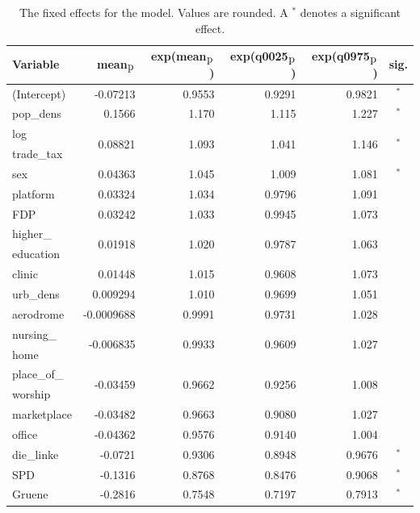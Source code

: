 \begin{table}[H]
\caption{The fixed effects for the model. Values are rounded. A $^*$ denotes a significant effect. \label{FixedAllGermany_nospatial}}
\begin{tabular}{l r r r r c}
\toprule
\textbf{Variable}	& \textbf{mean$_{\hbox{p}}$}	& \textbf{exp(mean$_{\hbox{p}}$)} & \textbf{exp(q0025$_{\hbox{p}}$)} & \textbf{exp(q0975$_{\hbox{p}}$)} & \textbf{sig.}\\
\midrule
(Intercept) & -0.07213 & 0.9553 & 0.9291 & 0.9821 & $^*$\\
pop\_dens & 0.1566 & 1.170 & 1.115 & 1.227 & $^*$\\
log & \multirow{2}{*}{0.08821} & \multirow{2}{*}{1.093} & \multirow{2}{*}{1.041} & \multirow{2}{*}{1.146} & \multirow{2}{*}{$^*$}\\
trade\_tax \\
sex & 0.04363 & 1.045 & 1.009 & 1.081 & $^*$\\
platform & 0.03324 & 1.034 & 0.9796 & 1.091 \\
FDP & 0.03242 & 1.033 & 0.9945 & 1.073 \\
higher\_ & \multirow{2}{*}{0.01918} & \multirow{2}{*}{1.020} & \multirow{2}{*}{0.9787} & \multirow{2}{*}{1.063} \\
education\\
clinic & 0.01448 & 1.015 & 0.9608 & 1.073 \\
urb\_dens & 0.009294 & 1.010 & 0.9699 & 1.051 \\
aerodrome & -0.0009688 & 0.9991 & 0.9731 & 1.028 \\
nursing\_ & \multirow{2}{*}{-0.006835} & \multirow{2}{*}{0.9933} & \multirow{2}{*}{0.9609} & \multirow{2}{*}{1.027} \\
home\\
place\_of\_ & \multirow{2}{*}{-0.03459} & \multirow{2}{*}{0.9662} & \multirow{2}{*}{0.9256} & \multirow{2}{*}{1.008} \\
worship\\
marketplace & -0.03482 & 0.9663 & 0.9080 & 1.027 \\
office & -0.04362 & 0.9576 & 0.9140 & 1.004 \\
die\_linke & -0.0721 & 0.9306 & 0.8948 & 0.9676 & $^*$\\
SPD & -0.1316 & 0.8768 & 0.8476 & 0.9068 & $^*$\\
Gruene & -0.2816 & 0.7548 & 0.7197 & 0.7913 & $^*$\\
\bottomrule
\end{tabular}
\end{table}
